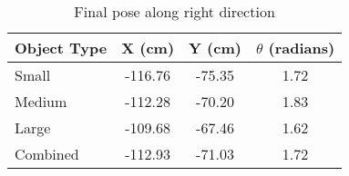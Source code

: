 \begin{table}[H]
\centering
\caption{Final pose along right direction}
\label{right}
\begin{tabular}{|l|c|c|c|}
	\hline
	\multicolumn{1}{|c|}{Object Type} & X (cm)  & Y (cm) & $\theta$ (radians) \\ \hline
	Small                             & -116.76 & -75.35 & 1.72    			  \\ %
	Medium                            & -112.28 & -70.20 & 1.83           	  \\ %
	Large                             & -109.68 & -67.46 & 1.62    			  \\ \hline
	Combined                          & -112.93 & -71.03 & 1.72    			  \\ \hline
\end{tabular}
\end{table}

